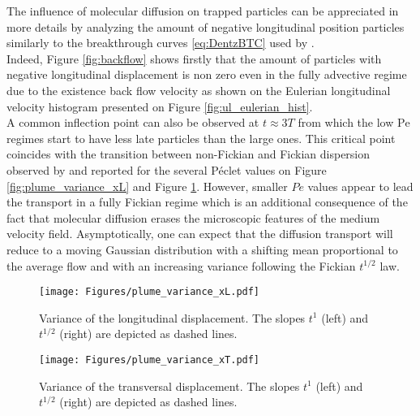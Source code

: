 The influence of molecular diffusion on trapped particles can be appreciated in more details by analyzing the amount of negative longitudinal position particles similarly to the breakthrough curves \eqref{eq:DentzBTC} used by \citet{Dentz2017}.\\ 
Indeed, Figure \ref{fig:backflow} shows firstly that the amount of particles with negative longitudinal displacement is non zero even in the fully advective regime due to the existence back flow velocity as shown on the Eulerian longitudinal velocity histogram presented on Figure \ref{fig:ul_eulerian_hist}.\\
A common inflection point can also be observed at $t\approx3T$ from which the low $\mathrm{Pe}$ regimes start to have less late particles than the large ones.
This critical point coincides with the transition between non-Fickian and Fickian dispersion observed by \citet[Fig. 2]{Meyer2016} and reported for the several Péclet values on Figure \ref{fig:plume_variance_xL} and Figure \ref{fig:plume_variance_xT}.
However, smaller $Pe$ values appear to lead the transport in a fully Fickian regime which is an additional consequence of the fact that molecular diffusion erases the microscopic features of the medium velocity field.
Asymptotically, one can expect that the diffusion transport will reduce to a moving Gaussian distribution with a shifting mean proportional to the average flow and with an increasing variance following the Fickian $t^{1/2}$ law.\\

\begin{figure}
	\centering
	\begin{minipage}{.49\textwidth}
	\centering
	\texttt{[image: Figures/plume\_variance\_xL.pdf]}
	\caption{Variance of the longitudinal displacement. The slopes $t^1$ (left) and $t^{1/2}$ (right) are depicted as dashed lines.}
	\label{fig:plume_variance_xL}
	\end{minipage}
	\begin{minipage}{.49\textwidth}
		\centering
		\texttt{[image: Figures/plume\_variance\_xT.pdf]}
		\caption{Variance of the transversal displacement. The slopes $t^1$ (left) and $t^{1/2}$ (right) are depicted as dashed lines.}
		\label{fig:plume_variance_xT}
	\end{minipage}
\end{figure}

